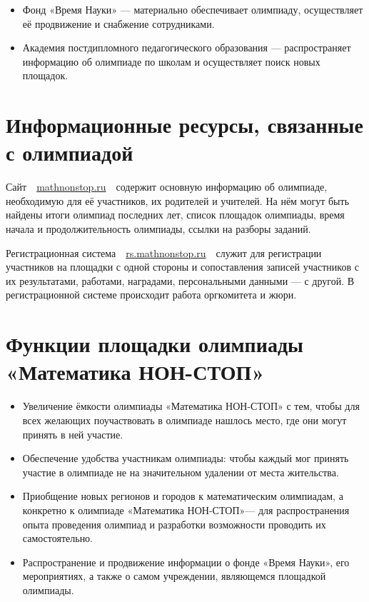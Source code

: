 \documentclass[a4paper,12pt]{article}
\newcommand{\mns}{«Математика НОН-СТОП»\xspace}
\begin{document}
\begin{itemize}
\item Фонд «Время Науки» — материально обеспечивает олимпиаду, осуществляет её продвижение и снабжение сотрудниками.

\item Академия постдипломного педагогического образования — распространяет информацию об олимпиаде по школам и осуществляет поиск новых площадок.
\end{itemize}

\section{Информационные ресурсы, связанные с олимпиадой}

Сайт\ \ \url{mathnonstop.ru}\ \ содержит основную информацию об олимпиаде, необходимую для её участников, их родителей и учителей. На нём могут быть найдены итоги олимпиад последних лет, список площадок олимпиады, время начала и продолжительность олимпиады, ссылки на разборы заданий.

Регистрационная система\ \ \url{rs.mathnonstop.ru}\ \ служит для регистрации участников на площадки с одной стороны и сопоставления записей участников с их результатами, работами, наградами, персональными данными — с другой. В регистрационной системе происходит работа оргкомитета и жюри.

\section{Функции площадки олимпиады \mns}

\begin{itemize}
	\item Увеличение ёмкости олимпиады \mns с тем, чтобы для всех желающих поучаствовать в олимпиаде нашлось место, где они могут принять в ней участие.
	\item Обеспечение удобства участникам олимпиады: чтобы каждый мог принять участие в олимпиаде не на значительном удалении от места жительства.
	\item Приобщение новых регионов и городов к математическим олимпиадам, а конкретно к олимпиаде \mns — для распространения опыта проведения олимпиад и разработки возможности проводить их самостоятельно.
	\item Распространение и продвижение информации о фонде «Время Науки», его мероприятиях, а также о самом учреждении, являющемся площадкой олимпиады.
\end{itemize}
\end{document}
